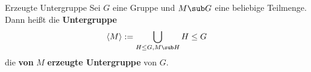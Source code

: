 \begin{definition}{Erzeugte Untergruppe}{}
Sei $G$ eine Gruppe und $M \sub G$ eine beliebige Teilmenge. Dann heißt die \textbf{Untergruppe}
\begin{equation}
\langle M \rangle := \bigcup_{H \leq G, M \sub H} H \leq G
\end{equation}
die \textbf{von} $M$ \textbf{erzeugte Untergruppe} von $G$.
\end{definition}